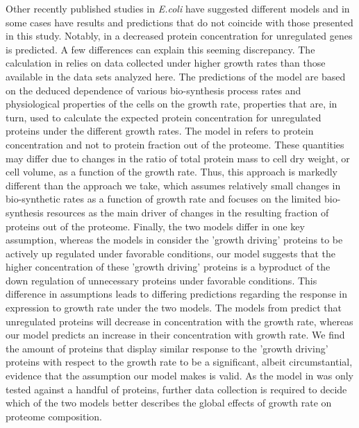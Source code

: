 \documentclass[10pt,letterpaper]{article}
\begin{document}
Other recently published studies in \emph{E.coli} have suggested different models and in some cases have results  and predictions that do not coincide with those presented in this study.
Notably, in \cite{Klumpp2009,Klumpp2014} a decreased protein concentration for unregulated genes is predicted.
A few differences can explain this seeming discrepancy.
The calculation in \cite{Klumpp2009} relies on data collected under higher growth rates than those available in the data sets analyzed here.
The predictions of the model are based on the deduced dependence of various bio-synthesis process rates and physiological properties of the cells on the growth rate, properties that are, in turn, used to calculate the expected protein concentration for unregulated proteins under the different growth rates.
The model in \cite{Klumpp2009} refers to protein concentration and not to protein fraction out of the proteome. These quantities may differ due to changes in the ratio of total protein mass to cell dry weight, or cell volume, as a function of the growth rate.
Thus, this approach is markedly different than the approach we take, which assumes relatively small changes in bio-synthetic rates as a function of growth rate and focuses on the limited bio-synthesis resources as the main driver of changes in the resulting fraction of proteins out of the proteome.
Finally, the two models differ in one key assumption, whereas the models in \cite{Klumpp2009,Scott2010,Scott2011,Klumpp2014} consider the 'growth driving' proteins to be actively up regulated under favorable conditions, our model suggests that the higher concentration of these 'growth driving' proteins is a byproduct of the down regulation of unnecessary proteins under favorable conditions.
This difference in assumptions leads to differing predictions regarding the response in expression to growth rate under the two models.
The models from \cite{Klumpp2009,Scott2010,Scott2011,Klumpp2014} predict that unregulated proteins will decrease in concentration with the growth rate, whereas our model predicts an increase in their concentration with growth rate.
We find the amount of proteins that display similar response to the 'growth driving' proteins with respect to the growth rate to be a significant, albeit circumstantial, evidence that the assumption our model makes is valid.
As the model in \cite{Klumpp2009} was only tested against a handful of proteins, further data collection is required to decide which of the two models better describes the global effects of growth rate on proteome composition.
\end{document}
